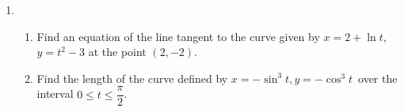 \documentclass[10pt]{article}
\begin{document}
\begin{enumerate}
%
%
%
%
%
%
%
%
%

%
%
%
%
%
%


\item
\begin{enumerate}

\item Find an equation of the line tangent to the curve given by $x=2+\ln t$, $y=t^2-3$ at the point $(2,-2)$.

\item Find the length of the curve defined by $x=-\sin^3 t, y=-\cos^3 t$\ over the interval $0\le t\le \dfrac{\pi}{2}$.

\end{enumerate}


\end{enumerate}
\end{document}

